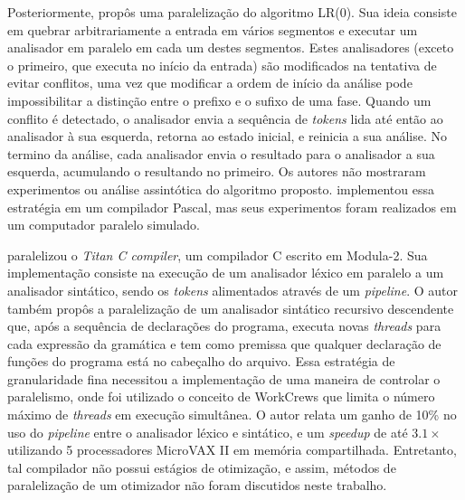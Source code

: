 Posteriormente, \cite{Mickunas:1978:PCM:800127.804105} propôs uma
paralelização do algoritmo LR($0$). Sua ideia consiste em quebrar
arbitrariamente a entrada em vários segmentos e executar um analisador em paralelo
em cada um destes segmentos. Estes analisadores (exceto o primeiro,
que executa no início da entrada) são modificados na tentativa de
evitar conflitos, uma vez que modificar a ordem de início da análise
pode impossibilitar a distinção entre o prefixo e o sufixo de uma fase.
Quando um conflito é detectado, o analisador envia a sequência de
\textit{tokens} lida até então ao analisador à sua esquerda,
retorna ao estado inicial, e reinicia a sua análise.
No termino da análise, cada analisador envia o resultado para o analisador
a sua esquerda, acumulando o resultando no primeiro.
Os autores não mostraram experimentos ou
análise assintótica do algoritmo proposto. \cite{Pennello:1978:FMA:512760.512786}
implementou essa estratégia em um compilador Pascal, mas seus experimentos foram
realizados em um computador paralelo simulado.

\cite{vandevoorde1988parallel} paralelizou o \textit{Titan C compiler}, um compilador
C escrito em Modula-2. Sua implementação consiste na execução de um analisador léxico
em paralelo a um analisador sintático, sendo os \textit{tokens} alimentados
através de um \textit{pipeline}. O autor também propôs a paralelização de um
analisador sintático recursivo descendente que, após a sequência de declarações do programa, executa novas \textit{threads}
para cada expressão da gramática e tem
como premissa que qualquer declaração de funções do programa está no
cabeçalho do
arquivo. Essa estratégia de granularidade fina necessitou a implementação de
uma maneira de controlar o paralelismo, onde foi utilizado o conceito de
WorkCrews \citep{vandevoorde1988workcrews} que limita o número máximo de
\textit{threads} em execução simultânea. O autor relata um ganho de 10\% no
uso do \textit{pipeline} entre o analisador léxico e sintático, e um
\textit{speedup} de até $3.1\times$ utilizando 5 processadores MicroVAX II em
memória compartilhada. Entretanto, tal compilador não possui estágios de
otimização, e assim, métodos de paralelização de um otimizador não foram discutidos neste trabalho.

